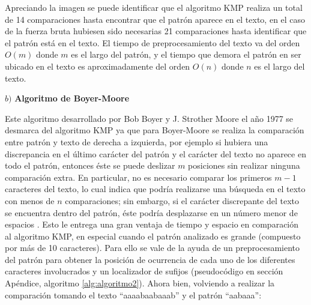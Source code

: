 Apreciando la imagen se puede identificar que el algoritmo KMP realiza un total de 14 comparaciones hasta encontrar que el patrón aparece en el texto, en el caso de la fuerza bruta hubiesen sido necesarias 21 comparaciones hasta identificar que el patrón está en el texto.
El tiempo de preprocesamiento del texto va del orden $O(m)$ donde $m$ es el largo del patrón, y el tiempo que demora el patrón en ser ubicado en el texto es aproximadamente del orden $O(n)$ donde $n$ es el largo del texto.

$b)$ \textbf{Algoritmo de Boyer-Moore}

Este algoritmo desarrollado por Bob Boyer y J. Strother Moore el año 1977 se desmarca del algoritmo KMP ya que para Boyer-Moore se realiza la comparación entre patrón y texto de derecha a izquierda, por ejemplo si hubiera una discrepancia en el último carácter del patrón y el carácter del texto no aparece en todo el patrón, entonces éste se puede deslizar $m$ posiciones sin realizar ninguna comparación extra. En particular, no es necesario comparar los primeros $m-1$ caracteres del texto, lo cual indica que podría realizarse una búsqueda en el texto con menos de $n$ comparaciones; sin embargo, si el carácter discrepante del texto se encuentra dentro del patrón, éste podría desplazarse en un número menor de espacios \cite{boyermoore}. Esto le entrega una gran ventaja de tiempo y espacio en comparación al algoritmo KMP, en especial cuando el patrón analizado es grande (compuesto por más de 10 caracteres). Para ello se vale de la ayuda de un preprocesamiento del patrón para obtener la posición de ocurrencia de cada uno de los diferentes caracteres involucrados y un localizador de sufijos (pseudocódigo en sección Apéndice, algoritmo \ref{alg:algoritmo2}). Ahora bien, volviendo a realizar la comparación tomando el texto ``aaaabaabaaab'' y el patrón ``aabaaa'': 

